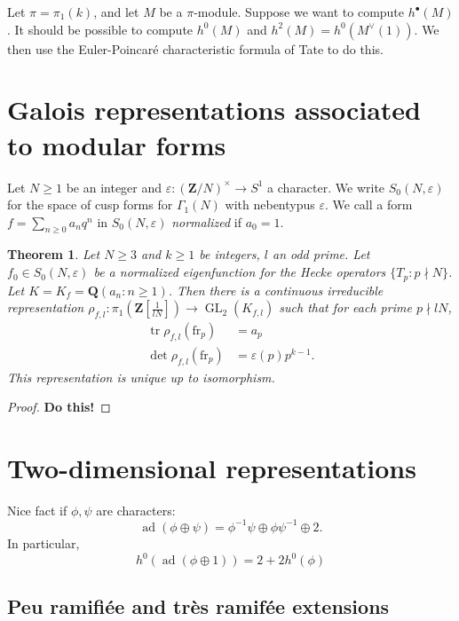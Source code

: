 \documentclass{amsart}
\DeclareMathOperator{\adjoint}{ad}
\DeclareMathOperator{\GL}{GL}
\DeclareMathOperator{\trace}{tr}
\newcommand{\dQ}{\mathbf{Q}}
\newcommand{\dZ}{\mathbf{Z}}
\newcommand{\arithfrob}{\mathrm{fr}}
\newtheorem{theorem}[subsection]{Theorem}
\begin{document}
Let $\pi=\pi_1(k)$, and let $M$ be a $\pi$-module. Suppose we want to compute 
$h^\bullet(M)$. It should be possible to compute 
$h^0(M)$ and $h^2(M)=h^0(M^\vee(1))$. We then use the Euler-Poincar\'e characteristic 
formula of Tate \cite[7.3.1]{nsw08} to do this. 





\section{Galois representations associated to modular forms}

Let $N\geqslant 1$ be an integer and $\varepsilon:(\dZ/N)^\times \to S^1$ a 
character. We write $S_0(N,\varepsilon)$ for the space of cusp forms for 
$\Gamma_1(N)$ with nebentypus $\varepsilon$. We call a form 
$f=\sum_{n\geqslant 0} a_n q^n$ in $S_0(N,\varepsilon)$ \emph{normalized} if 
$a_0=1$. 

\begin{theorem}
Let $N\geqslant 3$ and $k\geqslant 1$ be integers, $l$ an odd prime. Let 
$f_0\in S_0(N,\varepsilon)$ be a normalized eigenfunction for the Hecke 
operators $\{T_p:p\nmid N\}$. Let $K=K_f=\dQ(a_n:n\geqslant 1)$. 
Then there is a continuous irreducible representation 
$\rho_{f,l}:\pi_1\left(\dZ[\frac{1}{l N}]\right)\to \GL_2(K_{f,l})$ such that 
for each prime $p\nmid l N$, 
\begin{align*}
  \trace \rho_{f,l}(\arithfrob_p) &= a_p \\
  \det \rho_{f,l}(\arithfrob_p) &= \varepsilon(p) p^{k-1} .
\end{align*}
This representation is unique up to isomorphism. 
\end{theorem}
\begin{proof}
\textbf{Do this!}
\end{proof}





\section{Two-dimensional representations}

Nice fact if $\phi,\psi$ are characters: 
\[
  \adjoint(\phi\oplus \psi) = \phi^{-1}\psi\oplus \phi\psi^{-1}\oplus 2 .
\]
In particular, 
\[
  h^0(\adjoint(\phi\oplus 1)) = 2+2 h^0(\phi)
\]


\subsection{Peu ramifi\'ee and tr\`es ramif\'ee extensions}
\end{document}
